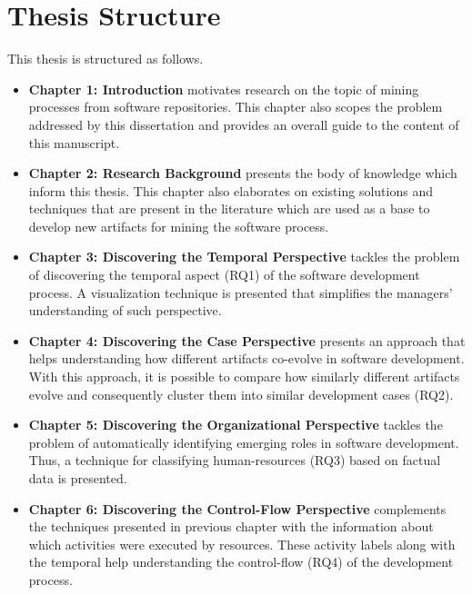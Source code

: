 \section{Thesis Structure}
\label{sec:intro-structure}


This thesis is structured as follows. 

\begin{itemize}
	\item \textbf{Chapter 1: Introduction} motivates research on the topic of mining processes from software repositories. This chapter also scopes the problem addressed by this dissertation and provides an overall guide to the content of this manuscript.
	
	\item \textbf{Chapter 2: Research Background} presents the body of knowledge which inform this thesis. 
	This chapter also elaborates on existing solutions and techniques that are present in the literature which are used as a base to develop new artifacts for mining the software process. 
	
	\item \textbf{Chapter 3: Discovering the Temporal Perspective} tackles the problem of discovering the temporal aspect (RQ1) of the software development process. A visualization technique is presented that simplifies the managers' understanding of such perspective.
	
	\item \textbf{Chapter 4: Discovering the Case Perspective}  presents an approach that helps understanding how different artifacts co-evolve in software development. With this approach, it is possible to compare how similarly different artifacts evolve and consequently cluster them into similar development cases (RQ2).  
	
	\item \textbf{Chapter 5: Discovering the Organizational Perspective} tackles the problem of automatically identifying emerging roles in software development. Thus, a technique for classifying human-resources (RQ3) based on factual data is presented.
	
	\item \textbf{Chapter 6: Discovering the Control-Flow Perspective} complements the techniques presented in previous chapter with the information about which activities were executed by resources. These activity labels along with the temporal help understanding the control-flow (RQ4) of the development process.
	

\end{itemize}
